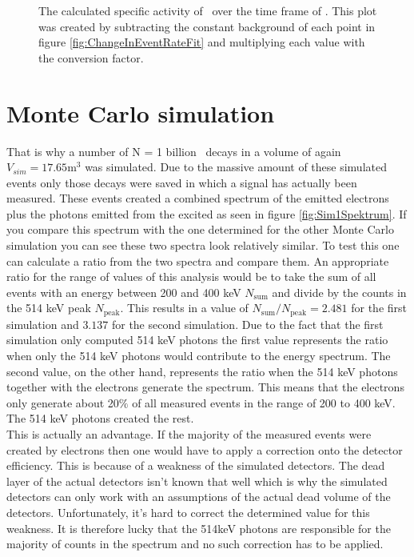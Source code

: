 \documentclass[encoding=utf8,british]{tumphthesis}
\begin{document}
\begin{figure}[t!]
\begin{minipage}[t]{.475\textwidth}
		\caption{
		The calculated specific activity of \Kr\ over the time frame of \PII.
		This plot was created by subtracting the constant background of each point in figure \ref{fig:ChangeInEventRateFit} and multiplying each value with the conversion factor.
		}
		\label{fig:activity}
	\end{minipage}
\end{figure}

\section{Monte Carlo simulation}
\label{sec:MonteCarlo2}

That is why a number of N = 1 billion \Kr\ decays in a volume of again $V_{sim} = 17.65 \mathrm{m}^3$ was simulated.
Due to the massive amount of these simulated events only those decays were saved in which a signal has actually been measured.
These events created a combined spectrum of the emitted electrons plus the photons emitted from the excited  as seen in figure \ref{fig:Sim1Spektrum}.
If you compare this spectrum with the one determined for the other Monte Carlo simulation you can see these two spectra look relatively similar.
To test this one can calculate a ratio from the two spectra and compare them.
An appropriate ratio for the range of values of this analysis would be to take the sum of all events with an energy between 200 and 400 keV $N_{\mathrm{sum}}$ and divide by the counts in the 514 keV peak $N_ {\mathrm{peak}}$.
This results in a value of $N_{\mathrm{sum}}/N_{\mathrm{peak}} = 2.481$ for the first simulation and $3.137$ for the second simulation.
Due to the fact that the first simulation only computed 514 keV photons the first value represents the ratio when only the 514 keV photons would contribute to the energy spectrum.
The second value, on the other hand, represents the ratio when the 514 keV photons together with the electrons generate the spectrum.
This means that the electrons only generate about 20$\%$ of all measured events in the range of 200 to 400 keV.
The 514 keV photons created the rest.
\\

This is actually an advantage.
If the majority of the measured events were created by electrons then one would have to apply a correction onto the detector efficiency.
This is because of a weakness of the simulated detectors.
The dead layer of the actual detectors isn't known that well which is why the simulated detectors can only work with an assumptions of the actual dead volume of the detectors.
Unfortunately, it's hard to correct the determined value for this weakness.
It is therefore lucky that the 514keV photons are responsible for the majority of counts in the spectrum and no such correction has to be applied.
\\
\end{document}
